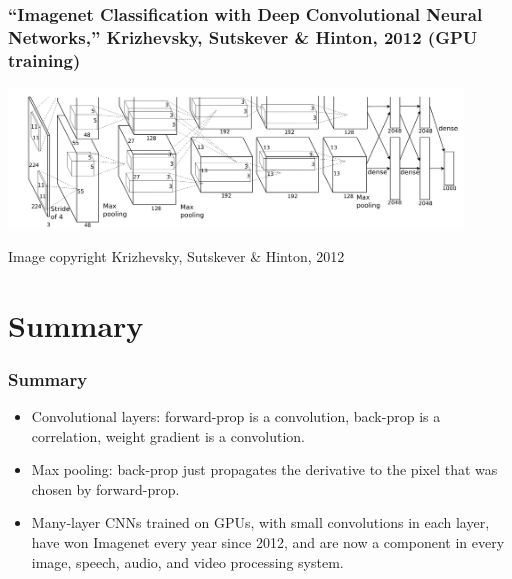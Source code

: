\documentclass{beamer}
\begin{document}
\begin{frame}
  \frametitle{``Imagenet Classification with Deep Convolutional Neural
    Networks,'' Krizhevsky, Sutskever \& Hinton, 2012 (GPU training)}
  \centerline{\includegraphics[width=4.75in]{figs/krizhevsky2012.png}}
  \begin{tiny}Image copyright Krizhevsky, Sutskever \& Hinton, 2012\end{tiny}
\end{frame}


\section{Summary}
\setcounter{subsection}{1}

\begin{frame}
  \frametitle{Summary}
  \begin{itemize}
  \item Convolutional layers: forward-prop is a convolution, back-prop
    is a correlation, weight gradient is a convolution.
  \item Max pooling: back-prop just propagates the derivative to the
    pixel that was chosen by forward-prop.
  \item Many-layer CNNs trained on GPUs, with small convolutions in
    each layer, have won Imagenet every year since 2012, and are now a
    component in every image, speech, audio, and video processing
    system.
  \end{itemize}
\end{frame}
\end{document}
